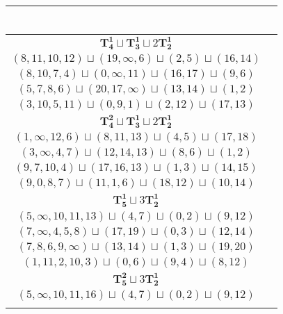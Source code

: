 \documentclass{article}
\begin{document}
\begin{longtable}{|c|c|}
\begin{tabular}{c}
        \end{tabular} \\ 
        \hline
        $\mathbf{T_{4}^{1}} \sqcup \mathbf{T_{3}^{1}} \sqcup 2\mathbf{T_{2}^{1}}$ & \begin{tabular}{c}
        $(11,13,12,15)\sqcup(9,\infty,1)\sqcup(4,5)\sqcup(16,18)$ \\ 
        $(8,11,10,12)\sqcup(19,\infty,6)\sqcup(2,5)\sqcup(16,14)$ \\ 
        $(8,10,7,4)\sqcup(0,\infty,11)\sqcup(16,17)\sqcup(9,6)$ \\ 
        $(5,7,8,6)\sqcup(20,17,\infty)\sqcup(13,14)\sqcup(1,2)$ \\ 
        $(3,10,5,11)\sqcup(0,9,1)\sqcup(2,12)\sqcup(17,13)$
        \end{tabular} \\ 
        \hline
        $\mathbf{T_{4}^{2}} \sqcup \mathbf{T_{3}^{1}} \sqcup 2\mathbf{T_{2}^{1}}$ & \begin{tabular}{c}
        $(18,16,19,\infty)\sqcup(13,12,15)\sqcup(3,5)\sqcup(17,20)$ \\ 
        $(1,\infty,12,6)\sqcup(8,11,13)\sqcup(4,5)\sqcup(17,18)$ \\ 
        $(3,\infty,4,7)\sqcup(12,14,13)\sqcup(8,6)\sqcup(1,2)$ \\ 
        $(9,7,10,4)\sqcup(17,16,13)\sqcup(1,3)\sqcup(14,15)$ \\ 
        $(9,0,8,7)\sqcup(11,1,6)\sqcup(18,12)\sqcup(10,14)$
        \end{tabular} \\ 
        \hline
        $\mathbf{T_{5}^{1}} \sqcup 3\mathbf{T_{2}^{1}}$ & \begin{tabular}{c}
        $(4,1,\infty,13,10)\sqcup(2,3)\sqcup(16,15)\sqcup(9,11)$ \\ 
        $(5,\infty,10,11,13)\sqcup(4,7)\sqcup(0,2)\sqcup(9,12)$ \\ 
        $(7,\infty,4,5,8)\sqcup(17,19)\sqcup(0,3)\sqcup(12,14)$ \\ 
        $(7,8,6,9,\infty)\sqcup(13,14)\sqcup(1,3)\sqcup(19,20)$ \\ 
        $(1,11,2,10,3)\sqcup(0,6)\sqcup(9,4)\sqcup(8,12)$
        \end{tabular} \\ 
        \hline
        $\mathbf{T_{5}^{2}} \sqcup 3\mathbf{T_{2}^{1}}$ & \begin{tabular}{c}
        $(1,\infty,13,10,7)\sqcup(2,3)\sqcup(16,15)\sqcup(9,11)$ \\ 
        $(5,\infty,10,11,16)\sqcup(4,7)\sqcup(0,2)\sqcup(9,12)$ \\ 

\end{tabular}
\end{longtable}
\end{document}
